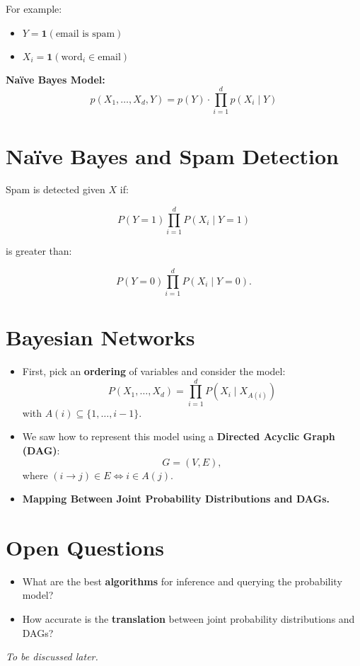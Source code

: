 \documentclass{article}%
\begin{document}
For example:
\begin{itemize}
    \item \( Y = \mathbf{1}(\text{email is spam}) \)
    \item \( X_i = \mathbf{1}(\text{word}_i \in \text{email}) \)
\end{itemize}

\textbf{Naïve Bayes Model:}
\[
p(X_1, \dots, X_d, Y) = p(Y) \cdot \prod_{i=1}^{d} p(X_i \mid Y)
\]

\section*{Naïve Bayes and Spam Detection}
Spam is detected given \( X \) if:

\[
P(Y=1) \prod_{i=1}^{d} P(X_i \mid Y=1)
\]

is greater than:

\[
P(Y=0) \prod_{i=1}^{d} P(X_i \mid Y=0).
\]

\section*{Bayesian Networks}
\begin{itemize}
    \item First, pick an \textbf{ordering} of variables and consider the model:
          \[
          P(X_1, \dots, X_d) = \prod_{i=1}^{d} P(X_i \mid X_{A(i)})
          \]
          with \( A(i) \subseteq \{1, \dots, i-1\} \).
    \item We saw how to represent this model using a \textbf{Directed Acyclic Graph (DAG)}:
          \[
          G = (V, E),
          \]
          where \( (i \to j) \in E \iff i \in A(j) \).
    \item \textbf{Mapping Between Joint Probability Distributions and DAGs.}
\end{itemize}

\section*{Open Questions}
\begin{itemize}
    \item What are the best \textbf{algorithms} for inference and querying the probability model?
    \item How accurate is the \textbf{translation} between joint probability distributions and DAGs?
\end{itemize}

\textit{To be discussed later.}
\end{document}
